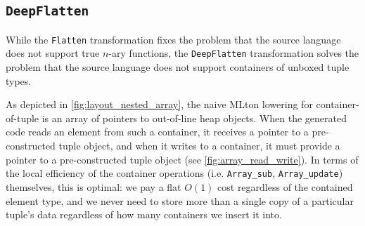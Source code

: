 \label{sec:background_deep_flatten}
\subsection{\texttt{DeepFlatten}}
While the \texttt{Flatten} transformation fixes the problem that the source
language does not support true $n$-ary functions, the \texttt{DeepFlatten}
transformation solves the problem that the source language does not support
containers of unboxed tuple types.

As depicted in \cref{fig:layout_nested_array}, the naive MLton lowering for
container-of-tuple is an array of pointers to out-of-line heap objects. When the
generated code reads an element from such a container, it receives a pointer to
a pre-constructed tuple object, and when it writes to a container, it must
provide a pointer to a pre-constructed tuple object (see
\cref{fig:array_read_write}). In terms of the local efficiency of the container
operations (i.e. \texttt{Array\_sub}, \texttt{Array\_update}) themselves, this is
optimal: we pay a flat $O(1)$ cost regardless of the contained element type, and
we never need to store more than a single copy of a particular tuple's data
regardless of how many containers we insert it into.

